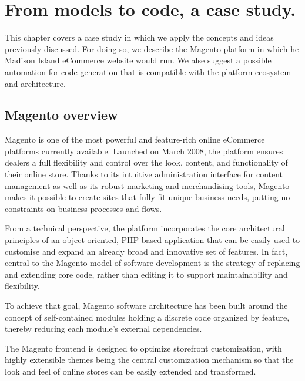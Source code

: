 \chead{}

\chapter{From models to code, a case study.}

This chapter covers a case study in which we apply the concepts and ideas previously discussed. For doing so, we describe the Magento platform in which he Madison Island eCommerce website would run. We alse suggest a possible automation for code generation that is compatible with the platform ecosystem and architecture.

\section{Magento overview}

Magento is one of the most powerful and feature-rich online eCommerce platforms currently available. Launched on March 2008, the platform ensures dealers a full flexibility and control over the look, content, and functionality of their online store. Thanks to its intuitive administration interface for content management as well as its robust marketing and merchandising tools, Magento makes it possible to create sites that fully fit unique business needs, putting no constraints on business processes and flows.

From a technical perspective, the platform incorporates the core architectural principles of an object-oriented, PHP-based application that can be easily used to customise and expand an already broad and innovative set of features. In fact, central to the Magento model of software development is the strategy of replacing and extending core code, rather than editing it to support maintainability and flexibility. 

To achieve that goal, Magento software architecture has been built around the concept of self-contained modules holding a discrete code organized by feature, thereby reducing each module’s external dependencies.

The Magento frontend is designed to optimize storefront customization, with highly extensible themes being the central customization mechanism so that the look and feel of online stores can be easily extended and transformed.

